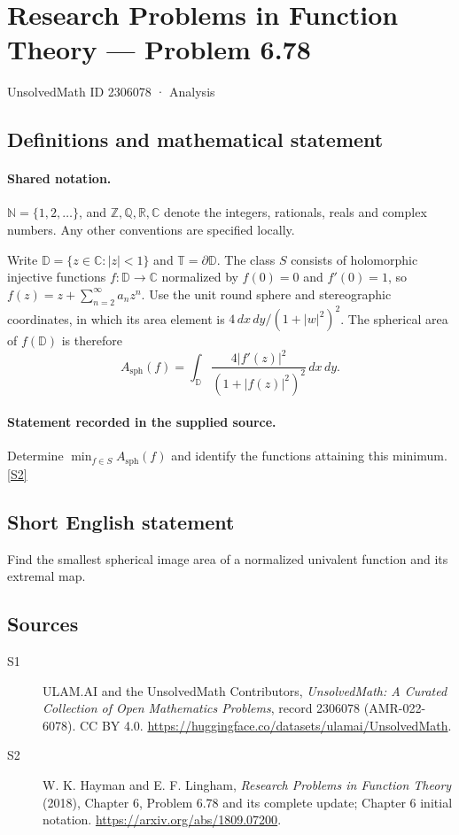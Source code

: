 \documentclass[11pt]{article}
\newcommand{\sref}[2]{\hyperlink{source:#1:#2}{[S#2]}}
\begin{document}
\setcounter{section}{2306077}
\section{Research Problems in Function Theory — Problem 6.78}\label{2306078}
{\small\sffamily UnsolvedMath ID 2306078 · Analysis}
\subsection{Definitions and mathematical statement}

\paragraph{Shared notation.}$\mathbb N=\{1,2,\ldots\}$, and $\mathbb Z,\mathbb Q,\mathbb R,\mathbb C$ denote the integers, rationals, reals and complex numbers. Any other conventions are specified locally.


Write $\mathbb D=\{z\in\mathbb C:|z|<1\}$ and $\mathbb T=\partial\mathbb D$. The class $S$ consists of holomorphic injective functions $f:\mathbb D\to\mathbb C$ normalized by $f(0)=0$ and $f'(0)=1$, so $f(z)=z+\sum_{n=2}^{\infty}a_nz^n$. Use the unit round sphere and stereographic coordinates, in which its area element is $4\,dx\,dy/(1+|w|^2)^2$. The spherical area of $f(\mathbb D)$ is therefore \[A_{\mathrm{sph}}(f)=\int_{\mathbb D}\frac{4|f'(z)|^2}{(1+|f(z)|^2)^2}\,dx\,dy.\]
\paragraph{Statement recorded in the supplied source.}
Determine $\min_{f\in S}A_{\mathrm{sph}}(f)$ and identify the functions attaining this minimum. \sref{2306078}{2}
\subsection{Short English statement}
Find the smallest spherical image area of a normalized univalent function and its extremal map.
\subsection{Sources}
\begin{description}
\item[\hypertarget{source:2306078:1}{S1}] ULAM.AI and the UnsolvedMath Contributors, \emph{UnsolvedMath: A Curated Collection of Open Mathematics Problems}, record 2306078 (AMR-022-6078). CC BY 4.0. \url{https://huggingface.co/datasets/ulamai/UnsolvedMath}.
\item[\hypertarget{source:2306078:2}{S2}] W. K. Hayman and E. F. Lingham, \emph{Research Problems in Function Theory} (2018), Chapter 6, Problem 6.78 and its complete update; Chapter 6 initial notation. \url{https://arxiv.org/abs/1809.07200}.
\end{description}
\label{end:2306078}
\end{document}

